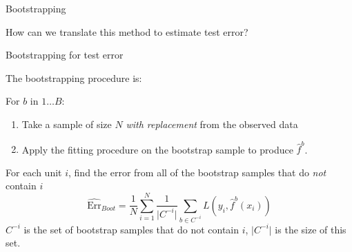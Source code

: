 \documentclass[xcolor={table}, handout]{beamer}
\begin{document}



\begin{frame}{Bootstrapping}

\begin{wideitemize}
\item How can we translate this method to estimate test error?
\end{wideitemize}

\end{frame}



\begin{frame}{Bootstrapping for test error}


The bootstrapping procedure is:

\begin{wideitemize}
\item For $b$ in $1\dots B$:\pause
\begin{enumerate}

    \item Take a sample of size $N$  \textit{with replacement} from the observed data\pause

    \item Apply the fitting procedure on the bootstrap sample to produce $\hat f^b$.
    \end{enumerate}
\pause
\item For each unit $i$, find the error from all of the bootstrap samples that do \textit{not} contain $i$\pause
\[
\widehat{\textrm{Err}}_{Boot} = \frac{1}{N}\sum_{i = 1}^N \frac{1}{\lvert C^{-i} \rvert}\sum_{b \in C^{-i}} L(y_i, \hat f^b (x_i))
\]
$C^{-i}$ is the set of bootstrap samples that do not contain $i$, $\lvert C^{-i} \rvert$ is the size of this set.
\end{wideitemize}

\end{frame}
\end{document}
